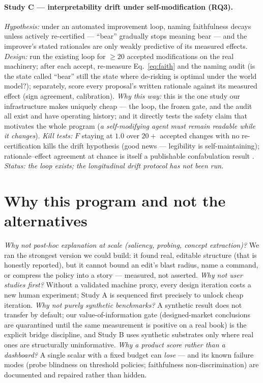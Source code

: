 \documentclass[11pt]{article}
\begin{document}
\paragraph{Study C --- interpretability drift under self-modification (RQ3).}
\emph{Hypothesis:} under an automated improvement loop, naming faithfulness decays unless
actively re-certified --- ``bear'' gradually stops meaning bear --- and the improver's stated
rationales are only weakly predictive of its measured effects. \emph{Design:} run the existing
loop for $\ge 20$ accepted modifications on the real machinery; after each accept, re-measure
Eq.~\ref{eq:faith} and the naming audit (is the state called ``bear'' still the state where
de-risking is optimal under the world model?); separately, score every proposal's written
rationale against its measured effect (sign agreement, calibration). \emph{Why this way:} this
is the one study our infrastructure makes uniquely cheap --- the loop, the frozen gate, and
the audit all exist and have operating history; and it directly tests the safety claim that
motivates the whole program (\emph{a self-modifying agent must remain readable while it
changes}). \emph{Kill tests:} $F$ staying at $1.0$ over $20{+}$ accepted changes with no
re-certification kills the drift hypothesis (good news --- legibility is self-maintaining);
rationale--effect agreement at chance is itself a publishable confabulation result
\citep{jacovi2020}. \emph{Status: the loop exists; the longitudinal drift protocol has not
been run.}

\section{Why this program and not the alternatives}
\label{sec:whynot}

\emph{Why not post-hoc explanation at scale (saliency, probing, concept extraction)?} We ran
the strongest version we could build: it found real, editable structure (that is honestly
reported), but it cannot bound an edit's blast radius, name a command, or compress the policy
into a story --- measured, not asserted. \emph{Why not user studies first?} Without a
validated machine proxy, every design iteration costs a new human experiment; Study A is
sequenced first precisely to unlock cheap iteration. \emph{Why not purely synthetic
benchmarks?} A synthetic result does not transfer by default; our value-of-information gate
(designed-market conclusions are quarantined until the same measurement is positive on a real
book) is the explicit bridge discipline, and Study B uses synthetic substrates only where
real ones are structurally uninformative. \emph{Why a product score rather than a dashboard?}
A single scalar with a fixed budget can \emph{lose} --- and its known failure modes (probe
blindness on threshold policies; faithfulness non-discrimination) are documented and repaired
rather than hidden.
\end{document}

